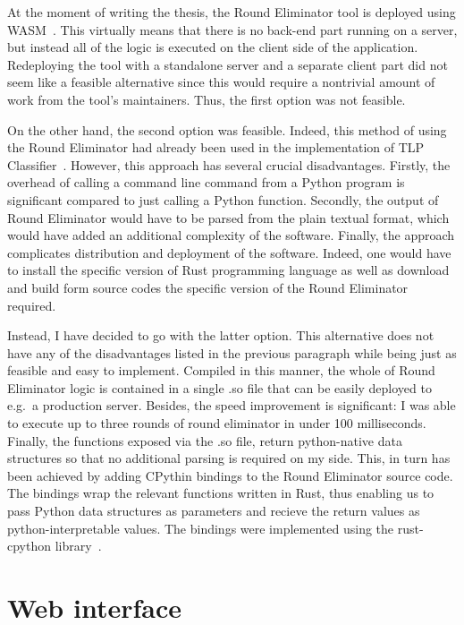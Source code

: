 At the moment of writing the thesis, the Round Eliminator tool
is deployed using WASM~\cite{WASM}. This virtually means that
there is no back-end part running on a server, but instead
all of the logic is executed on the client side of the application.
Redeploying the tool with a standalone server and a separate client
part did not seem like a feasible alternative since this would
require a nontrivial amount of work from the tool's maintainers.
Thus, the first option was not feasible.

On the other hand, the second option was feasible. Indeed,
this method of using the Round Eliminator had already been used in the
implementation of TLP Classifier~\cite{Rocher2020clas}. However,
this approach has several crucial disadvantages.
Firstly, the overhead of calling a command line command
from a Python program is significant compared to just calling
a Python function. Secondly, the output of Round Eliminator
would have to be parsed from the plain textual format, which
would have added an additional complexity of the software.
Finally, the approach complicates distribution and deployment of
the software. Indeed, one would have to install the specific
version of Rust programming language as well as download and
build form source codes the specific version of the Round Eliminator required.

Instead, I have decided to go with the latter option. This
alternative does not have any of the disadvantages listed
in the previous paragraph while being just as feasible and
easy to implement. Compiled in this manner, the whole of
Round Eliminator logic is contained in a single .so file
that can be easily deployed to e.g.\ a production server.
Besides, the speed improvement is significant: I was
able to execute up to three rounds of round eliminator
in under 100 milliseconds. Finally, the functions
exposed via the .so file, return python-native
data structures so that no additional parsing is required on my side.
This, in turn has been achieved by adding CPythin bindings
to the Round Eliminator source code. The bindings wrap the relevant functions
written in Rust, thus enabling us to pass Python data structures
as parameters and recieve the return values as python-interpretable values.
The bindings were implemented using the rust-cpython library~\cite{RustCPython}.


\section{Web interface}
\label{section:webinterface}

